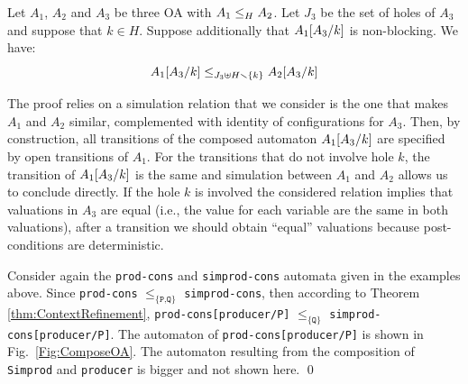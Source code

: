 \documentclass[runningheads]{llncs}
\begin{document}
\begin{theorem}\label{thm:ContextRefinement}
Let $A_1$, $A_2$ and $A_3$ be three OA with $\wrel{A_1}{A_2}{H}$. 
Let $J_3$ be the set of holes of $A_3$ and suppose that $k \in H$.
Suppose additionally that  \(A_1\subst{A_3}{k}\) is non-blocking.
We have: \[\wrel{A_1\subst{A_3}{k}}{A_2\subst{A_3}{k}}{J_3 \uplus H \setminus \mbrc{k}}\]
\end{theorem}



%
%
%
%



\begin{proofsketch}
The proof relies on a simulation relation that we consider is the one that makes $A_1$ and $A_2$ similar, complemented with identity of configurations for $A_3$.
Then, by construction, all transitions of the composed automaton $A_1\subst{A_3}{k}$ are specified by open transitions of $A_1$. For the transitions that do not involve hole $k$, the transition of $A_1\subst{A_3}{k}$ is the same and simulation between $A_1$ and $A_2$ allows us to conclude directly. If the hole $k$ is involved the considered relation  implies that valuations in $A_3$ are equal (i.e., the value for each variable are the same in both valuations), after a transition we should obtain ``equal'' valuations because post-conditions are deterministic.
\end{proofsketch}

\begin{example}  Consider again the \texttt{prod-cons} and \texttt{simprod-cons}  automata given in the examples above.  Since  \texttt{prod-cons} $\leq_{\{\texttt{P,Q}\}}$ \texttt{simprod-cons},  then according to Theorem \ref{thm:ContextRefinement}, 
\texttt{prod-cons[producer/P]} $\leq_{\{\texttt{Q}\}}$  \texttt{simprod-cons[producer/P]}. 
The automaton of \texttt{prod-cons[producer/P]} is shown in Fig.~\ref{Fig:ComposeOA}.
The automaton resulting  from the composition of  \texttt{Simprod} and \texttt{producer} is bigger and not shown here. \qed
\end{example}
\end{document}

